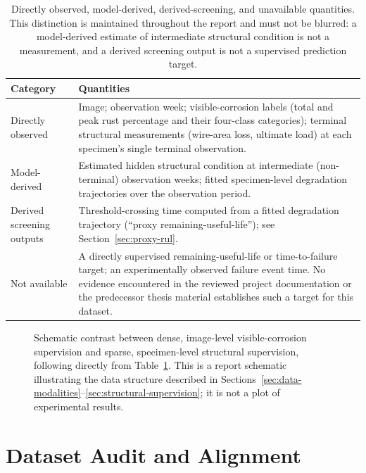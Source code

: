 \begin{table}[htbp]
\centering
\caption{Directly observed, model-derived, derived-screening, and
unavailable quantities. This distinction is maintained throughout the
report and must not be blurred: a model-derived estimate of intermediate
structural condition is not a measurement, and a derived screening output
is not a supervised prediction target.}
\label{tab:quantity-availability}
\begin{tabular}{p{3.1cm}p{9.6cm}}
\toprule
Category & Quantities \\
\midrule
Directly observed &
Image; observation week; visible-corrosion labels (total and peak rust
percentage and their four-class categories); terminal structural
measurements (wire-area loss, ultimate load) at each specimen's single
terminal observation. \\[2mm]
Model-derived &
Estimated hidden structural condition at intermediate (non-terminal)
observation weeks; fitted specimen-level degradation trajectories over
the observation period. \\[2mm]
Derived screening outputs &
Threshold-crossing time computed from a fitted degradation trajectory
(``proxy remaining-useful-life''); see Section~\ref{sec:proxy-rul}. \\[2mm]
Not available &
A directly supervised remaining-useful-life or time-to-failure target;
an experimentally observed failure event time. No evidence encountered in
the reviewed project documentation or the predecessor thesis material
establishes such a target for this dataset. \\
\bottomrule
\end{tabular}
\end{table}

\begin{figure}[htbp]
\centering
\resizebox{0.7\textwidth}{!}{}
\caption{Schematic contrast between dense, image-level visible-corrosion
supervision and sparse, specimen-level structural supervision, following
directly from Table~\ref{tab:quantity-availability}. This is a report
schematic illustrating the data structure described in
Sections~\ref{sec:data-modalities}--\ref{sec:structural-supervision}; it is
not a plot of experimental results.}
\label{fig:dataset-supervision-schematic}
\end{figure}

\section{Dataset Audit and Alignment}
\label{sec:dataset-audit}

